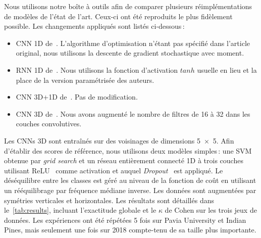 Nous utilisons notre boîte à outils afin de comparer plusieurs réimplémentations de modèles de l'état de l'art. Ceux-ci ont été reproduits le plus fidèlement possible. Les changements appliqués sont listés ci-dessous\,:
\begin{itemize}
	\item \gls{CNN} 1D de~\citet{hu_deep_2015}. L'algorithme d'optimisation n'étant pas spécifié dans l'article original, nous utilisons la descente de gradient stochastique avec moment.
    \item \gls{RNN} 1D de~\citet{mou_deep_2017}. Nous utilisons la fonction d'activation $tanh$ usuelle en lieu et la place de la version paramétrisée des auteurs.
    \item \gls{CNN} 3D+1D de~\citet{ben_hamida_deep_2016}. Pas de modification.
    \item \gls{CNN} 3D de~\citet{li_spectralspatial_2017}. Nous avons augmenté le nombre de filtres de 16 à 32 dans les couches convolutives.
\end{itemize}

Les \glspl{CNN} 3D sont entraînés sur des voisinages de dimensions \num{5x5}. Afin d'établir des scores de référence, nous utilisons deux modèles simples\,: une \gls{SVM} obtenue par \emph{grid search} et un réseau entièrement connecté 1D à trois couches utilisant \gls{ReLU}~\cite{nair_rectified_2010} comme activation et auquel \emph{Dropout}~\cite{srivastava_dropout_2014} est appliqué. Le déséquilibre entre les classes est géré au niveau de la fonction de coût en utilisant un rééquilibrage par fréquence médiane inverse. Les données sont augmentées par symétries verticales et horizontales. Les résultats sont détaillés dans le~\cref{tab:results}, incluant l'exactitude globale et le $\kappa$ de Cohen sur les trois jeux de données. Les expériences ont été répétées 5 fois sur Pavia University et Indian Pines, mais seulement une fois sur  2018 compte-tenu de sa taille plus importante.

